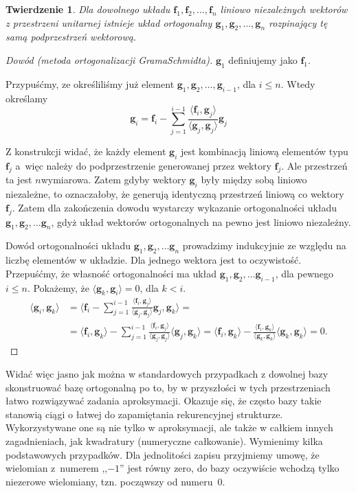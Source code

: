 \documentclass[12pt]{mwbk}
\let\leq\leqslant\let\le\leq\let\geq\geqslant\let\ge\geq
\theoremstyle{plain}
\newtheorem{twier}{Twierdzenie}[chapter] %
\theoremstyle{definition}
\theoremstyle{remark}
\newcommand{\ff}{\mathbf{f}}
\newcommand{\gggg}{\mathbf{g}}
\newcommand{\skalar}[2]{\pmb{\langle}#1,#2\pmb{\rangle}}
\begin{document}
\begin{twier}
	Dla dowolnego układu $\ff_1,\ff_2,\ldots, \ff_n$ liniowo niezależnych
	wektorów z przestrzeni unitarnej istnieje układ ortogonalny
	$\gggg_1,\gggg_2,\ldots,\gggg_n$ rozpinający tę samą podprzestrzeń wektorową.
\end{twier}
\begin{proof}[Dowód \emph{(metoda \emph{ortogonalizacji Grama\dywiz Schmidta})}]
$\gggg_1$ definiujemy jako $\ff_1$. 

Przypuśćmy, ze określiliśmy już element $\gggg_1,\gggg_2,\ldots,\gggg_{i-1}$, dla
$i\leq n$. Wtedy określamy
\[
\gggg_i=\ff_i-\sum_{j=1}^{i-1}\frac{\skalar{\ff_i}{\gggg_j}}{\skalar{\gggg_j}{\gggg_j}}\gggg_j
	\]

	Z konstrukcji widać, że każdy element $\gggg_i$ jest kombinacją liniową
	elementów typu $\ff_j$ a~więc należy do podprzestrzenie generowanej
	przez wektory $\ff_j$. Ale przestrzeń ta jest $n$\dywiz wymiarowa. Zatem
	gdyby wektory $\gggg_i$ były między sobą liniowo niezależne, to
	oznaczałoby, że generują identyczną przestrzeń liniową co wektory
	$\ff_j$. Zatem dla zakończenia dowodu wystarczy wykazanie ortogonalności
	układu 
	$\gggg_1,\gggg_2,\ldots \gggg_n$, 
	gdyż układ wektorów ortogonalnych na
	pewno jest liniowo niezależny. 

	Dowód ortogonalności układu
	$\gggg_1,\gggg_2,\ldots \gggg_n$ prowadzimy indukcyjnie ze względu na liczbę
	elementów w układzie. Dla jednego wektora jest to
	oczywistość. Przepuśćmy, że własność ortogonalności ma układ  
	$\gggg_1,\gggg_2,\ldots \gggg_{i-1}$, dla pewnego $i\leq n$. Pokażemy, że
	$\skalar{\gggg_k}{\gggg_i}=0$, dla $k<i$.
	\[
\begin{aligned}
\skalar{\gggg_i}{\gggg_k}&=\skalar{
\ff_i-\sum_{j=1}^{i-1}\frac{\skalar{\ff_i}{\gggg_j}}{\skalar{\gggg_j}{\gggg_j}}\gggg_j 
}{\gggg_k}=\\
&=
\skalar{\ff_i}{\gggg_k}-\sum_{j=1}^{i-1}\frac{\skalar{\ff_i}{\gggg_j}}{\skalar{\gggg_j}{\gggg_j}}\skalar{\gggg_j}{\gggg_k} 
=
\skalar{\ff_i}{\gggg_k}-\frac{\skalar{\ff_i}{\gggg_k}}{\skalar{\gggg_k}{\gggg_k}}\skalar{\gggg_k}{\gggg_k} 
=0.
\end{aligned}
\]
\end{proof}


Widać więc jasno jak można w standardowych przypadkach z dowolnej bazy
skonstruować bazę ortogonalną po to, by w przyszłości w tych przestrzeniach
łatwo rozwiązywać zadania aproksymacji. Okazuje się, że często bazy takie
stanowią ciągi o łatwej do zapamiętania rekurencyjnej strukturze. Wykorzystywane
one są nie tylko w aproksymacji, ale także w całkiem innych zagadnieniach, jak
kwadratury (numeryczne całkowanie). Wymienimy kilka podstawowych przypadków.
Dla jednolitości zapisu przyjmiemy umowę, że wielomian z~numerem ,,$-1$'' jest
równy zero, do bazy oczywiście wchodzą tylko niezerowe wielomiany, tzn.
począwszy od numeru~$0$.
\end{document}
